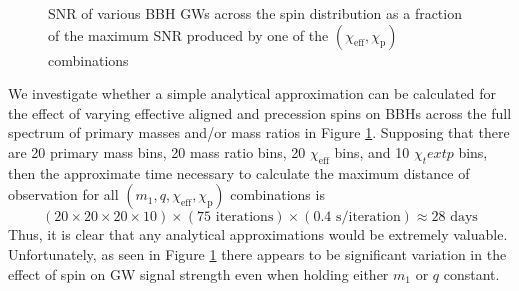 \documentclass{article}
\begin{document}
\begin{figure}[!htb]
    \caption{\label{fig:spinrel} SNR of various BBH GWs across the spin distribution as a fraction of the maximum SNR produced by one of the $(\chi_\text{eff}, \chi_\text{p})$ combinations}
\end{figure}

We investigate whether a simple analytical approximation can be calculated for the effect of varying effective aligned and precession spins on BBHs across the full spectrum of primary masses and/or mass ratios in Figure \ref{fig:spinrel}. Supposing that there are 20 primary mass bins, 20 mass ratio bins, 20 $\chi_\text{eff}$ bins, and 10 $\chi_text{p}$ bins, then the approximate time necessary to calculate the maximum distance of observation for all $(m_1, q, \chi_\text{eff}, \chi_\text{p})$ combinations is 
\begin{equation}
    (20 \times 20 \times 20 \times 10) \times (75 \text{ iterations}) \times (0.4 \text{ s/iteration}) \approx 28 \text{ days}
\end{equation}
Thus, it is clear that any analytical approximations would be extremely valuable. Unfortunately, as seen in Figure \ref{fig:spinrel} there appears to be significant variation in the effect of spin on GW signal strength even when holding either $m_1$ or $q$ constant. 
\end{document}
